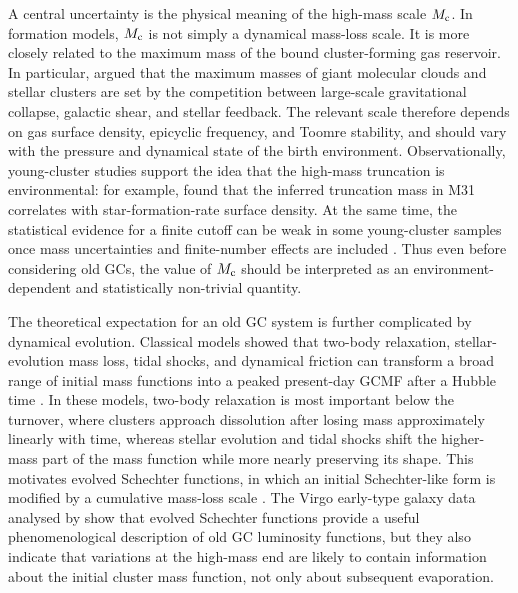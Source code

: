 \documentclass[fleqn,usenatbib]{mnras}
\begin{document}
A central uncertainty is the physical meaning of the high-mass scale $M_{\rm c}$. In formation models, $M_{\rm c}$ is not simply a dynamical mass-loss scale. It is more closely related to the maximum mass of the bound cluster-forming gas reservoir. In particular, \citet{ReinaCamposKruijssen2017} argued that the maximum masses of giant molecular clouds and stellar clusters are set by the competition between large-scale gravitational collapse, galactic shear, and stellar feedback. The relevant scale therefore depends on gas surface density, epicyclic frequency, and Toomre stability, and should vary with the pressure and dynamical state of the birth environment. Observationally, young-cluster studies support the idea that the high-mass truncation is environmental: for example, \citet{Johnson2017} found that the inferred truncation mass in M31 correlates with star-formation-rate surface density. At the same time, the statistical evidence for a finite cutoff can be weak in some young-cluster samples once mass uncertainties and finite-number effects are included \citep{Mok2019}. Thus even before considering old GCs, the value of $M_{\rm c}$ should be interpreted as an environment-dependent and statistically non-trivial quantity.

The theoretical expectation for an old GC system is further complicated by dynamical evolution. Classical models showed that two-body relaxation, stellar-evolution mass loss, tidal shocks, and dynamical friction can transform a broad range of initial mass functions into a peaked present-day GCMF after a Hubble time \citep{GnedinOstriker1997,FallZhang2001}. In these models, two-body relaxation is most important below the turnover, where clusters approach dissolution after losing mass approximately linearly with time, whereas stellar evolution and tidal shocks shift the higher-mass part of the mass function while more nearly preserving its shape. This motivates evolved Schechter functions, in which an initial Schechter-like form is modified by a cumulative mass-loss scale \citep{Jordan2007}. The Virgo early-type galaxy data analysed by \citet{Jordan2007} show that evolved Schechter functions provide a useful phenomenological description of old GC luminosity functions, but they also indicate that variations at the high-mass end are likely to contain information about the initial cluster mass function, not only about subsequent evaporation.
\end{document}

